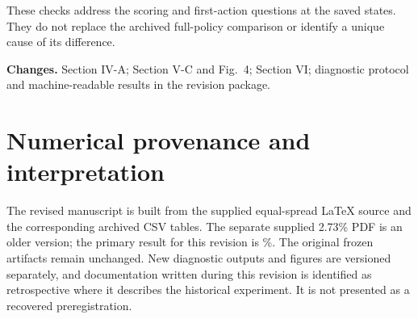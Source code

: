 \documentclass[11pt]{article}
\begin{document}
\DiagnosticResultsText

These checks address the scoring and first-action questions at the saved states. They do not replace the archived full-policy comparison or identify a unique cause of its difference.

\textbf{Changes.} Section IV-A; Section V-C and Fig.~4; Section VI; diagnostic protocol and machine-readable results in the revision package.

\section*{Numerical provenance and interpretation}
The revised manuscript is built from the supplied equal-spread LaTeX source and the corresponding archived CSV tables. The separate supplied 2.73\% PDF is an older version; the primary result for this revision is \PrimaryReductionPct\%. The original frozen artifacts remain unchanged. New diagnostic outputs and figures are versioned separately, and documentation written during this revision is identified as retrospective where it describes the historical experiment. It is not presented as a recovered preregistration.
\end{document}
